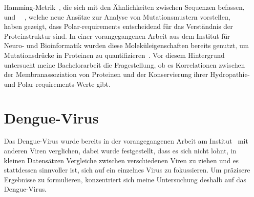 \documentclass[german,version-2022-01]{uzl-thesis}
\begin{document}
Hamming-Metrik~\cite{hammingMetric}, die sich mit den \"Ahnlichkeiten zwischen Sequenzen befassen, und \citeauthor{lenstra2015}~\citeyear{lenstra2015}~\cite{lenstra2015}, welche neue Ans\"atze zur Analyse von Mutationsmustern vorstellen, haben gezeigt, dass Polar-requirements entscheidend f\"ur das Verst\"andnis der Proteinstruktur sind. In einer vorangegangenen Arbeit aus dem Institut f\"ur Neuro- und Bioinformatik wurden diese Molek\"uleigenschaften bereits genutzt, um Mutationsdr\"ucke in Proteinen zu quantifizieren~\cite{nina}. Vor diesem Hintergrund untersucht meine Bachelorarbeit die Fragestellung, ob es Korrelationen zwischen der Membranassoziation von Proteinen und der Konservierung ihrer Hydropathie- und Polar-requirements-Werte gibt.

\section{Dengue-Virus}
Das Dengue-Virus wurde bereits in der vorangegangenen Arbeit am Institut~\cite{nina} mit anderen Viren verglichen, dabei wurde festgestellt, dass es sich nicht lohnt, in kleinen Datens\"atzen Vergleiche zwischen verschiedenen Viren zu ziehen und es stattdessen sinnvoller ist, sich auf ein einzelnes Virus zu fokussieren. Um pr\"azisere Ergebnisse zu formulieren, konzentriert sich meine Untersuchung deshalb auf das Dengue-Virus. 
\end{document}
